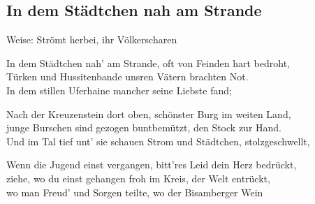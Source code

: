 
\subsection*{In dem Städtchen nah am Strande}
%
%

\hfill%
Weise: Strömt herbei, ihr Völkerscharen%

\thestrophe In dem Städtchen nah' am Strande, oft von Feinden hart bedroht, \\
Türken und Hussitenbande unsren Vätern brachten Not. \\
In dem stillen Uferhaine mancher seine Liebste fand; \\

\thestrophe Nach der Kreuzenstein dort oben, schönster Burg im weiten Land, \\
junge Burschen sind gezogen buntbemützt, den Stock zur Hand. \\
Und im Tal tief unt' sie schauen Strom und Städtchen, stolzgeschwellt, \\ 

\thestrophe Wenn die Jugend einst vergangen, bitt'res Leid dein Herz bedrückt, \\
ziehe, wo du einst gehangen froh im Kreis, der Welt entrückt, \\
wo man Freud' und Sorgen teilte, wo der Bisamberger Wein \\
